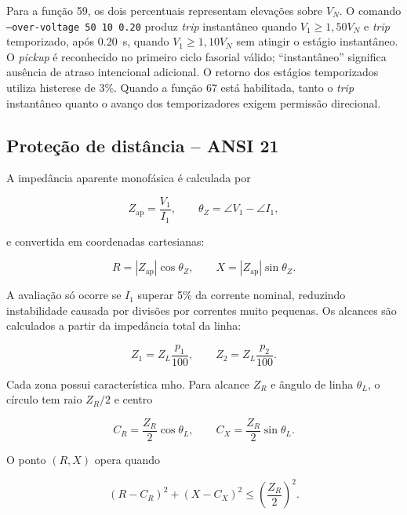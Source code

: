 Para a função 59, os dois percentuais representam elevações sobre $V_N$. O comando \texttt{--over-voltage 50 10 0.20} produz \textit{trip} instantâneo quando $V_1\geq1{,}50V_N$ e \textit{trip} temporizado, após \SI{0,20}{\second}, quando $V_1\geq1{,}10V_N$ sem atingir o estágio instantâneo. O \textit{pickup} é reconhecido no primeiro ciclo fasorial válido; ``instantâneo'' significa ausência de atraso intencional adicional. O retorno dos estágios temporizados utiliza histerese de 3\%. Quando a função 67 está habilitada, tanto o \textit{trip} instantâneo quanto o avanço dos temporizadores exigem permissão direcional.

\subsection{Proteção de distância -- ANSI 21}

A impedância aparente monofásica é calculada por

\begin{equation}
  Z_{\mathrm{ap}}=\frac{V_1}{I_1}, \qquad
  \theta_Z=\angle V_1-\angle I_1,
\end{equation}

e convertida em coordenadas cartesianas:

\begin{equation}
  R=|Z_{\mathrm{ap}}|\cos\theta_Z, \qquad
  X=|Z_{\mathrm{ap}}|\sin\theta_Z.
\end{equation}

A avaliação só ocorre se $I_1$ superar 5\% da corrente nominal, reduzindo instabilidade causada por divisões por correntes muito pequenas. Os alcances são calculados a partir da impedância total da linha:

\begin{equation}
  Z_1=Z_L\frac{p_1}{100}, \qquad
  Z_2=Z_L\frac{p_2}{100}.
\end{equation}

Cada zona possui característica mho. Para alcance $Z_R$ e ângulo de linha $\theta_L$, o círculo tem raio $Z_R/2$ e centro

\begin{equation}
  C_R=\frac{Z_R}{2}\cos\theta_L, \qquad
  C_X=\frac{Z_R}{2}\sin\theta_L.
\end{equation}

O ponto $(R,X)$ opera quando

\begin{equation}
  (R-C_R)^2+(X-C_X)^2\leq\left(\frac{Z_R}{2}\right)^2.
  \label{eq:mho-operacao}
\end{equation}

